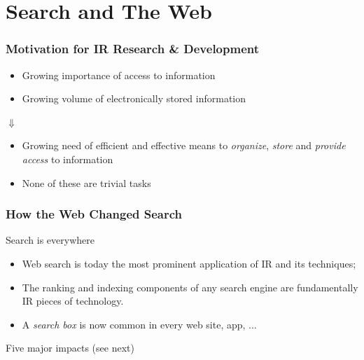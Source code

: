 \documentclass[svgnames]{beamer}
\begin{document}
\section{Search and The Web}


\begin{frame}
  \frametitle{Motivation for IR Research \& Development}

  \begin{block}{}
    \begin{itemize}
    \item Growing importance of access to information
    \item Growing volume of electronically stored information
    \end{itemize}
  \end{block}

  \begin{center}
    {\Huge $\Downarrow$}
  \end{center}

  \begin{block}{}
    \begin{itemize}
    \item Growing need of efficient and effective means to \emph{organize},
      \emph{store} and \emph{provide access} to information
    \item None of these are trivial tasks
    \end{itemize}
  \end{block}
\end{frame}


\begin{frame}
  \frametitle{How the Web Changed Search}

\begin{block}{Search is everywhere}

\begin{itemize}
\item Web search is today the most prominent application of IR and its
techniques;
\item The ranking and indexing components of any search engine are fundamentally IR pieces of technology. 

\item A \emph{search box} is now common in every web site, app, ...

\end{itemize}
\end{block}

\begin{block}{}
Five major impacts (see next)
\end{block}


\end{frame}
\end{document}

